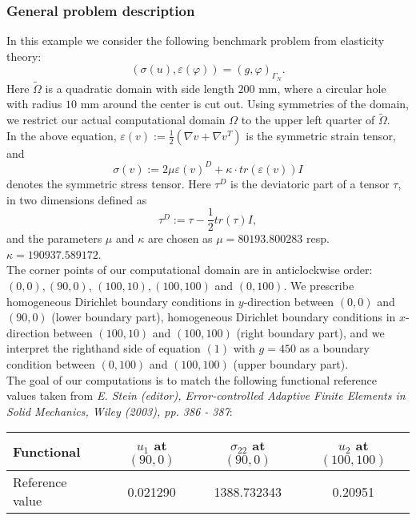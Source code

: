 \subsubsection{General problem description}

In this example we consider the following benchmark problem from elasticity theory:  
\begin{equation}
   (\sigma(u),\varepsilon(\varphi)) = (g,\varphi)_{\Gamma_N}.
\end{equation}
Here $\tilde{\Omega}$ is a quadratic domain with side length $200$ mm, where a circular hole with radius $10$ mm around the center is cut out. Using symmetries of the domain, we restrict our actual computational domain $\Omega$ to the upper left quarter of $\tilde{\Omega}$.\\
In the above equation, $\varepsilon(v) := \frac{1}{2}(\nabla v + \nabla v^T)$ is the symmetric strain tensor, and 
\begin{equation*}
   \sigma(v) := 2\mu \varepsilon(v)^D + \kappa \cdot tr (\varepsilon(v)) I
\end{equation*}
denotes the symmetric stress tensor. Here $\tau^D$ is the deviatoric part of a tensor $\tau$, in two dimensions defined as 
\begin{equation*}
   \tau^D := \tau - \frac{1}{2} tr(\tau) I,
\end{equation*}
and the parameters $\mu$ and $\kappa$ are chosen as $\mu = 80193.800283$ resp. $\kappa = 190937.589172$.\\
The corner points of our computational domain are in anticlockwise order: $(0,0), (90,0)$, $(100,10), (100,100)$ and $(0,100)$. We prescribe homogeneous Dirichlet boundary conditions in $y$-direction between $(0,0)$ and $(90,0)$ (lower boundary part), homogeneous Dirichlet boundary conditions in $x$-direction between $(100,10)$ and $(100,100)$ (right boundary part), and we interpret the righthand side of equation $(1)$ with $g = 450$ as a boundary condition between $(0,100)$ and $(100,100)$ (upper boundary part).\\
The goal of our computations is to match the following functional reference values taken from \textit{E. Stein (editor), Error-controlled Adaptive Finite Elements in Solid Mechanics, Wiley (2003), pp. 386 - 387}:
\begin{table}[h]
\centering
\begin{tabular}{lccc}    
\hline
 Functional & $u_1$ at $(90,0)$ & $\sigma_{22}$ at $(90,0)$ & $u_2$ at $(100,100)$\\
\hline 
 Reference value & 0.021290 & 1388.732343 & 0.20951\\
\hline
\end{tabular}
\end{table}
